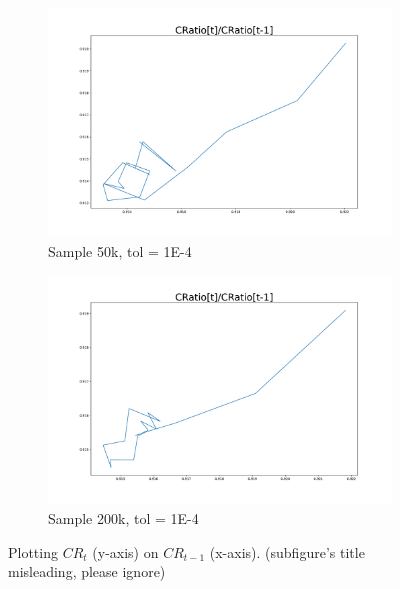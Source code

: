 \documentclass[]{article}
\begin{document}
\begin{figure}
\begin{subfigure}[b]{0.45\textwidth}
		\includegraphics[width=1.2\textwidth]{../50kSample_BaseCal_TolE-4/CRatio.pdf}
		\caption{Sample 50k, tol = 1E-4}
		\label{fig:Cratio-50k}
	\end{subfigure}
	\hfill
	\begin{subfigure}[b]{0.45\textwidth}
		\centering
		\includegraphics[width=1.2\textwidth]{../200kSample_BaseCal_TolE-4/CRatio.pdf}
		\caption{Sample 200k, tol = 1E-4}
		\label{fig:Cratio-200k}
	\end{subfigure}
	\caption{Plotting $CR_t$ (y-axis) on $CR_{t-1}$ (x-axis). (subfigure's title misleading, please ignore)}
	\label{fig:CRatio}
\end{figure}
\end{document}
